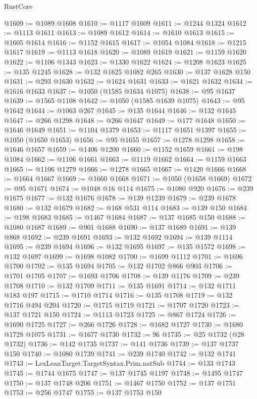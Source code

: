 \begin{lexlean}{RustCore}
\begin{coremodule}
@1609 := @1089 @1608
@1610 := @1117 @1609
@1611 := @1244 @1324
@1612 := @1113 @1611
@1613 := @1089 @1612
@1614 := @1610 @1613
@1615 := @1605 @1614
@1616 := @1152 @1615
@1617 := @1054 @1084
@1618 := @1215 @1617
@1619 := @1113 @1618
@1620 := @1089 @1619
@1621 := @1159 @1620
@1622 := @1106 @1343
@1623 := @1330 @1622
@1624 := @1208 @1623
@1625 := @135 @1245
@1628 := @132 @1625 @1082 @265
@1630 := @137 @1628 @150
@1631 := @293 @1630
@1632 := @1624 @1631
@1633 := @1621 @1632
@1634 := @1616 @1633
@1637 := @1050 (@1585 @1634 @1075)
@1638 := @95 @1637
@1639 := @1565 @1108
@1642 := @1050 (@1585 @1639 @1075)
@1643 := @95 @1642
@1644 := @1063 @267
@1645 := @135 @1644
@1646 := @132 @1645
@1647 := @266 @1298
@1648 := @266 @1647
@1649 := @177 @1648
@1650 := @1646 @1649
@1651 := @1104 @1379
@1653 := @1117 @1651 @1397
@1655 := @1050 (@1650 @1653)
@1656 := @95 @1655
@1657 := @1278 @1298
@1658 := @1646 @1657
@1659 := @1406 @1200
@1660 := @1152 @1659
@1661 := @198 @1084
@1662 := @1106 @1661
@1663 := @1119 @1662
@1664 := @1159 @1663
@1665 := @1106 @1279
@1666 := @1278 @1665
@1667 := @1420 @1666
@1668 := @1664 @1667
@1669 := @1660 @1668
@1671 := @1050 (@1658 @1669)
@1672 := @95 @1671
@1674 := @1048 @16 @114
@1675 := @1080 @920
@1676 := @239 @1675
@1677 := @132 @1676
@1678 := @139 @1239
@1679 := @239 @1678
@1680 := @132 @1679
@1682 := @168 @531 @114
@1683 := @139 @150
@1684 := @198 @1683
@1685 := @1467 @1684
@1687 := @137 @1685 @150
@1688 := @1080 @1687
@1689 := @901 @1688
@1690 := @137 @1689
@1691 := @139 @868
@1692 := @239 @1691
@1693 := @132 @1692
@1694 := @139 @1114
@1695 := @239 @1694
@1696 := @132 @1695
@1697 := @135 @1572
@1698 := @132 @1697
@1699 := @1698 @1082
@1700 := @1699 @1112
@1701 := @1696 @1700
@1702 := @135 @1694
@1705 := @132 @1702 @866 @903
@1706 := @1701 @1705
@1707 := @1693 @1706
@1708 := @139 @1176
@1709 := @239 @1708
@1710 := @132 @1709
@1711 := @135 @1691
@1714 := @132 @1711 @183 @197
@1715 := @1710 @1714
@1716 := @135 @1708
@1719 := @132 @1716 @494 @204
@1720 := @1715 @1719
@1721 := @1707 @1720
@1723 := @137 @1721 @150
@1724 := @1113 @1723
@1725 := @867 @1724
@1726 := @1690 @1725
@1727 := @266 @1726
@1728 := @1682 @1727
@1730 := @1680 @1728 @1075
@1731 := @1677 @1730
@1732 := 96
@1735 := @25 @1732 (@28 @1732)
@1736 := @142 @1735
@1737 := @141 @1736
@1739 := @137 @1737 @150
@1740 := @1080 @1739
@1741 := @239 @1740
@1742 := @132 @1741
@1743 := LexLeanTarget.TargetSyntax.Prim.natSub
@1744 := @133 @1743
@1745 := @1744 @1675
@1747 := @137 @1745 @1197
@1748 := @1495 @1747
@1750 := @137 @1748 @206
@1751 := @1467 @1750
@1752 := @137 @1751
@1753 := @256 @1747
@1755 := @137 @1753 @150

\end{coremodule}
\end{lexlean}
